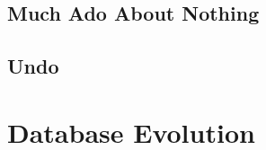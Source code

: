 \documentclass[english,submission]{programming}
\theoremstyle{definition}
\begin{document}

\subsection{Much Ado About Nothing}



\subsection{Undo}







\section{Database Evolution}
\end{document}
